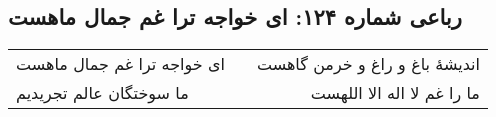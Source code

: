 \begin{center}
\section*{رباعی شماره ۱۲۴: ای خواجه ترا غم جمال ماهست}
\label{sec:sh124}
\begin{longtable}{l p{0.5cm} r}
ای خواجه ترا غم جمال ماهست
&&
اندیشهٔ باغ و راغ و خرمن گاهست
\\
ما سوختگان عالم تجریدیم
&&
ما را غم لا اله الا اللهست
\\
\end{longtable}
\end{center}
